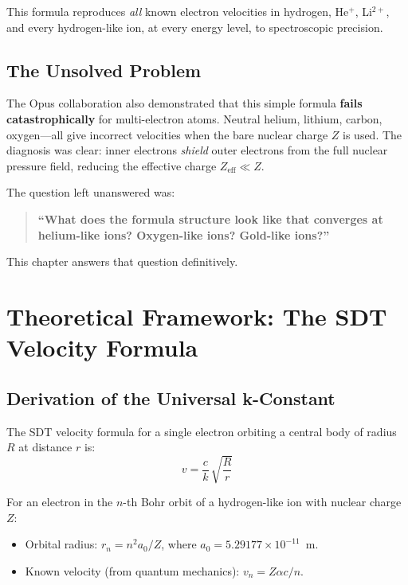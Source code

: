This formula reproduces \emph{all} known electron velocities in hydrogen, He$^+$, Li$^{2+}$, and every hydrogen-like ion, at every energy level, to spectroscopic precision.

\subsection{The Unsolved Problem}

The Opus collaboration also demonstrated that this simple formula \textbf{fails catastrophically} for multi-electron atoms.  Neutral helium, lithium, carbon, oxygen---all give incorrect velocities when the bare nuclear charge $Z$ is used.  The diagnosis was clear: inner electrons \emph{shield} outer electrons from the full nuclear pressure field, reducing the effective charge $Z_{\text{eff}} \ll Z$.

The question left unanswered was:

\begin{quote}
\textbf{``What does the formula structure look like that converges at helium-like ions?  Oxygen-like ions?  Gold-like ions?''}
\end{quote}

This chapter answers that question definitively.


\section{Theoretical Framework: The SDT Velocity Formula}

\subsection{Derivation of the Universal k-Constant}

The SDT velocity formula for a single electron orbiting a central body of radius $R$ at distance $r$ is:
\begin{equation}\label{eq:v-general}
  v = \frac{c}{k}\,\sqrt{\frac{R}{r}}
\end{equation}

For an electron in the $n$-th Bohr orbit of a hydrogen-like ion with nuclear charge $Z$:
\begin{itemize}
  \item Orbital radius: $r_n = n^2 a_0 / Z$, where $a_0 = 5.29177 \times 10^{-11}$~m.
  \item Known velocity (from quantum mechanics): $v_n = Z\alpha c / n$.
\end{itemize}

